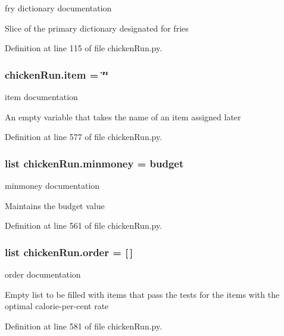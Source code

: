 fry dictionary documentation 

Slice of the primary dictionary designated for fries 

Definition at line 115 of file chicken\-Run.\-py.

\hypertarget{namespacechickenRun_a98224d68ad8caf68da8fea93ce10d743}{
\subsubsection[{item}]{\setlength{\rightskip}{0pt plus 5cm}chicken\-Run.\-item = \char`\"{}\char`\"{}}}\label{namespacechickenRun_a98224d68ad8caf68da8fea93ce10d743}


item documentation 

An empty variable that takes the name of an item assigned later 

Definition at line 577 of file chicken\-Run.\-py.

\hypertarget{namespacechickenRun_a81ecd1284781df6e7029889d67a37931}{
\subsubsection[{minmoney}]{\setlength{\rightskip}{0pt plus 5cm}list chicken\-Run.\-minmoney = {\bf budget}}}\label{namespacechickenRun_a81ecd1284781df6e7029889d67a37931}


minmoney documentation 

Maintains the budget value 

Definition at line 561 of file chicken\-Run.\-py.

\hypertarget{namespacechickenRun_af9a88d28efeddab4f4b4f6f44f9a512d}{
\subsubsection[{order}]{\setlength{\rightskip}{0pt plus 5cm}list chicken\-Run.\-order = \mbox{[}$\,$\mbox{]}}}\label{namespacechickenRun_af9a88d28efeddab4f4b4f6f44f9a512d}


order documentation 

Empty list to be filled with items that pass the tests for the items with the optimal calorie-\/per-\/cent rate 

Definition at line 581 of file chicken\-Run.\-py.

